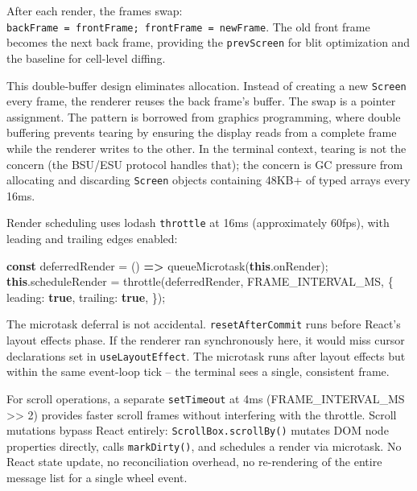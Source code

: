 \documentclass[
  english,
  11pt,
  letterpaper,
]{book}
\newenvironment{Shaded}{\begin{snugshade}}{\end{snugshade}}
\newcommand{\AttributeTok}[1]{\textcolor[rgb]{0.40,0.45,0.13}{#1}}
\newcommand{\FunctionTok}[1]{\textcolor[rgb]{0.28,0.35,0.67}{#1}}
\newcommand{\KeywordTok}[1]{\textcolor[rgb]{0.00,0.23,0.31}{\textbf{#1}}}
\newcommand{\NormalTok}[1]{\textcolor[rgb]{0.00,0.23,0.31}{#1}}
\newcommand{\OperatorTok}[1]{\textcolor[rgb]{0.37,0.37,0.37}{#1}}
\begin{document}
After each render, the frames swap:
\texttt{backFrame\ =\ frontFrame;\ frontFrame\ =\ newFrame}. The old
front frame becomes the next back frame, providing the
\texttt{prevScreen} for blit optimization and the baseline for
cell-level diffing.

This double-buffer design eliminates allocation. Instead of creating a
new \texttt{Screen} every frame, the renderer reuses the back frame's
buffer. The swap is a pointer assignment. The pattern is borrowed from
graphics programming, where double buffering prevents tearing by
ensuring the display reads from a complete frame while the renderer
writes to the other. In the terminal context, tearing is not the concern
(the BSU/ESU protocol handles that); the concern is GC pressure from
allocating and discarding \texttt{Screen} objects containing 48KB+ of
typed arrays every 16ms.

Render scheduling uses lodash \texttt{throttle} at 16ms (approximately
60fps), with leading and trailing edges enabled:

\begin{Shaded}
\begin{Highlighting}[]
\KeywordTok{const}\NormalTok{ deferredRender }\OperatorTok{=}\NormalTok{ () }\KeywordTok{=\textgreater{}} \FunctionTok{queueMicrotask}\NormalTok{(}\KeywordTok{this}\OperatorTok{.}\AttributeTok{onRender}\NormalTok{)}\OperatorTok{;}
\KeywordTok{this}\OperatorTok{.}\AttributeTok{scheduleRender} \OperatorTok{=} \FunctionTok{throttle}\NormalTok{(deferredRender}\OperatorTok{,}\NormalTok{ FRAME\_INTERVAL\_MS}\OperatorTok{,}\NormalTok{ \{}
\NormalTok{  leading}\OperatorTok{:} \KeywordTok{true}\OperatorTok{,}
\NormalTok{  trailing}\OperatorTok{:} \KeywordTok{true}\OperatorTok{,}
\NormalTok{\})}\OperatorTok{;}
\end{Highlighting}
\end{Shaded}

The microtask deferral is not accidental. \texttt{resetAfterCommit} runs
before React's layout effects phase. If the renderer ran synchronously
here, it would miss cursor declarations set in \texttt{useLayoutEffect}.
The microtask runs after layout effects but within the same event-loop
tick -- the terminal sees a single, consistent frame.

For scroll operations, a separate \texttt{setTimeout} at 4ms
(FRAME\_INTERVAL\_MS \textgreater\textgreater{} 2) provides faster
scroll frames without interfering with the throttle. Scroll mutations
bypass React entirely: \texttt{ScrollBox.scrollBy()} mutates DOM node
properties directly, calls \texttt{markDirty()}, and schedules a render
via microtask. No React state update, no reconciliation overhead, no
re-rendering of the entire message list for a single wheel event.
\end{document}

